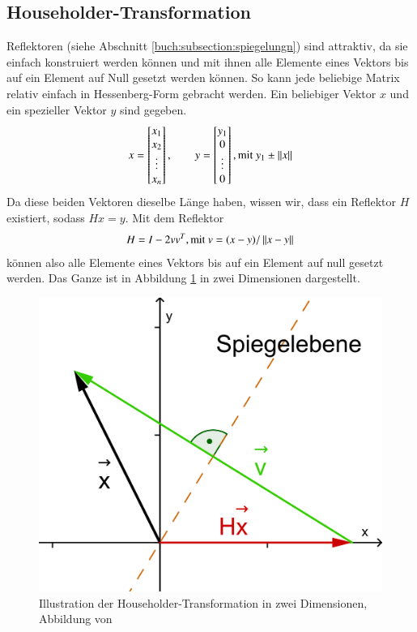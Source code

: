 \subsection{Householder-Transformation\label{francis:section:grundlagen:householder}}
Reflektoren (siehe Abschnitt \ref{buch:subsection:spiegelungn}) sind attraktiv, da sie einfach konstruiert werden können und mit ihnen alle Elemente eines Vektors bis auf ein Element auf Null gesetzt werden können.
So kann jede beliebige Matrix relativ einfach in Hessenberg-Form gebracht werden.
Ein beliebiger Vektor $x$ und ein spezieller Vektor $y$ sind gegeben.
\begin{equation}
	x=
	\begin{bmatrix}
	x_{1}\\
	x_{2}\\
	\vdots\\
	x_{n}\\
	\end{bmatrix}
	,\qquad y=
	\begin{bmatrix}
	y_{1}\\
	0\\
	\vdots\\
	0\\
	\end{bmatrix}, \text{mit } y_{1}\pm \left\lVert x\right\rVert	
\end{equation}
Da diese beiden Vektoren dieselbe Länge haben, wissen wir, dass ein Reflektor $H$ existiert, sodass $Hx=y$.
Mit dem Reflektor
\begin{equation}
	H=I-2vv^{T}, \text{mit } v=(x-y)/\left\lVert x-y\right\rVert
\end{equation}
können also alle Elemente eines Vektors bis auf ein Element auf null gesetzt werden.
Das Ganze ist in Abbildung \ref{francis:abb:householder_transform} in zwei Dimensionen dargestellt.
\begin{figure}[h]
	\begin{center}
		\includegraphics[scale=0.1]{papers/francis/images/Householdertransformation.png}
		\caption{Illustration der Householder-Transformation in zwei Dimensionen, Abbildung von \cite{francis:householder}}
		\label{francis:abb:householder_transform}
	\end{center}
\end{figure}
